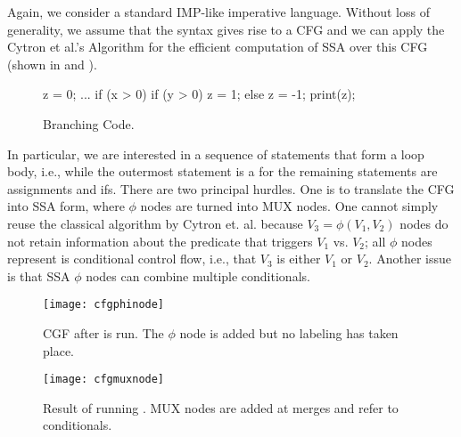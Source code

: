 Again, we consider a standard IMP-like\cite{Nipkow2014} imperative language.
Without loss of generality, we assume that the syntax gives rise to a CFG and we can apply the 
Cytron et al.'s Algorithm for the efficient computation of SSA over this CFG~\cite{Cytron1991}
(shown in  and ). 


\begin{figure}[h]
\centering
\begin{minipage}{0.7\textwidth}
\begin{javacode}
z = 0;
...
if (x > 0) {
  if (y > 0) {
    z = 1;
  }  else {
    z = -1;
  }
}
print(z);
\end{javacode}
\end{minipage}
\caption{Branching Code.}
\label{fig:examplecfgcode}
\end{figure}

In particular, we are interested in a sequence of statements that form a loop body, i.e., while 
the outermost statement is a {\sf for} the remaining statements are assignments and {\sf if}s.
There are two principal hurdles. One is to translate the CFG into SSA form, where $\phi$ nodes 
are turned into MUX nodes. One cannot simply reuse the classical algorithm by Cytron et. al. 
because $V_3 = \phi(V_1,V_2)$ nodes do not retain information about the predicate that triggers 
$V_1$ vs. $V_2$; all $\phi$ nodes represent is conditional control flow, i.e., that $V_3$ is either 
$V_1$ or $V_2$. Another issue is that SSA $\phi$ nodes can combine multiple conditionals. 

\begin{figure}[H]
\centering
\begin{minipage}{0.30\textwidth}
\texttt{[image: cfgphinode]}    
\end{minipage}
\caption{CGF after  is run.
The $\phi$ node is added but no labeling has taken place.}
\label{fig:cfgwithphinode}
\end{figure}

\begin{figure}[H]
\centering
\begin{minipage}{0.38\textwidth}
\texttt{[image: cfgmuxnode]}    
\end{minipage}
\caption{Result of running . 
MUX nodes are added at merges and refer to conditionals.}
\label{fig:cfgwithmuxnode}
\end{figure}

